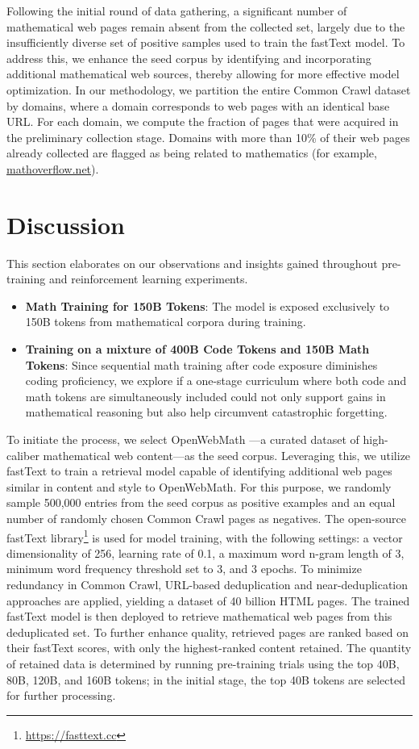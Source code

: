 \begin{itemize}[topsep=0pt]
Following the initial round of data gathering, a significant number of mathematical web pages remain absent from the collected set, largely due to the insufficiently diverse set of positive samples used to train the fastText model. To address this, we enhance the seed corpus by identifying and incorporating additional mathematical web sources, thereby allowing for more effective model optimization. In our methodology, we partition the entire Common Crawl dataset by domains, where a domain corresponds to web pages with an identical base URL. For each domain, we compute the fraction of pages that were acquired in the preliminary collection stage. Domains with more than 10\% of their web pages already collected are flagged as being related to mathematics (for example, \url{mathoverflow.net}). 

\section{Discussion}
This section elaborates on our observations and insights gained throughout pre-training and reinforcement learning experiments.

\begin{itemize}[topsep=0pt]
    \item \textbf{Math Training for 150B Tokens}: The model is exposed exclusively to 150B tokens from mathematical corpora during training.
    \item \textbf{Training on a mixture of 400B Code Tokens and 150B Math Tokens}: Since sequential math training after code exposure diminishes coding proficiency, we explore if a one-stage curriculum where both code and math tokens are simultaneously included could not only support gains in mathematical reasoning but also help circumvent catastrophic forgetting.
\end{itemize}

To initiate the process, we select OpenWebMath \citep{openwebmath}—a curated dataset of high-caliber mathematical web content—as the seed corpus. Leveraging this, we utilize fastText \citep{joulin2016fasttext} to train a retrieval model capable of identifying additional web pages similar in content and style to OpenWebMath. For this purpose, we randomly sample 500,000 entries from the seed corpus as positive examples and an equal number of randomly chosen Common Crawl pages as negatives. The open-source fastText library\footnote{\url{https://fasttext.cc}} is used for model training, with the following settings: a vector dimensionality of 256, learning rate of 0.1, a maximum word n-gram length of 3, minimum word frequency threshold set to 3, and 3 epochs. To minimize redundancy in Common Crawl, URL-based deduplication and near-deduplication approaches are applied, yielding a dataset of 40 billion HTML pages. The trained fastText model is then deployed to retrieve mathematical web pages from this deduplicated set. To further enhance quality, retrieved pages are ranked based on their fastText scores, with only the highest-ranked content retained. The quantity of retained data is determined by running pre-training trials using the top 40B, 80B, 120B, and 160B tokens; in the initial stage, the top 40B tokens are selected for further processing.


\end{itemize}
